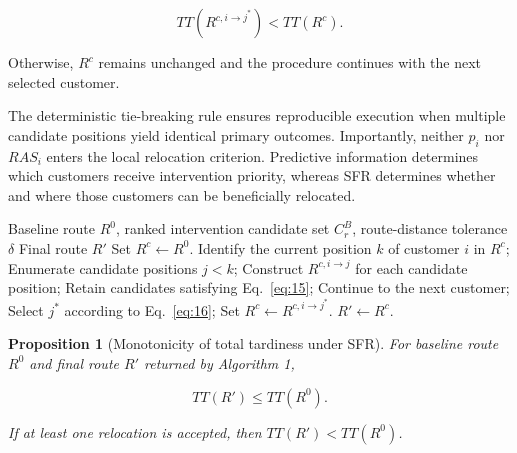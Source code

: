 \documentclass[11pt,a4paper]{article}
\newtheorem{proposition}{Proposition}
\begin{document}
\begin{equation}
TT\left( R^{c,i \rightarrow j^{*}} \right) < TT\left( R^{c} \right).
\label{eq:17}
\end{equation}

Otherwise, \(R^{c}\) remains unchanged and the procedure continues with
the next selected customer.

The deterministic tie-breaking rule ensures reproducible execution when
multiple candidate positions yield identical primary outcomes.
Importantly, neither \(p_{i}\) nor \(RAS_{i}\) enters the local
relocation criterion. Predictive information determines which customers
receive intervention priority, whereas SFR determines whether and where
those customers can be beneficially relocated.

\begin{algorithm}[htbp]
\caption{Selective Forward Relocation (SFR)}
\label{alg:sfr}
\begin{algorithmic}[1]
\Require Baseline route $R^{0}$, ranked intervention candidate set $C_{r}^{B}$, route-distance tolerance $\delta$
\Ensure Final route $R'$
\State Set $R^{c} \leftarrow R^{0}$.
    \State Identify the current position $k$ of customer $i$ in $R^{c}$;
    \State Enumerate candidate positions $j < k$;
    \State Construct $R^{c,i \rightarrow j}$ for each candidate position;
    \State Retain candidates satisfying Eq.~\eqref{eq:15};
        \State Continue to the next customer;
    \EndIf
    \State Select $j^{*}$ according to Eq.~\eqref{eq:16};
        \State Set $R^{c} \leftarrow R^{c,i \rightarrow j^{*}}$.
    \EndIf
\EndFor
\State \Return $R' \leftarrow R^{c}$.
\end{algorithmic}
\end{algorithm}

\begin{proposition}[Monotonicity of total tardiness under SFR]
For baseline route \(R^{0}\) \emph{and final route} \(R'\)
\emph{returned by Algorithm 1,}

\begin{equation}
TT\left( R' \right) \leq TT\left( R^{0} \right).
\label{eq:18}
\end{equation}

\emph{If at least one relocation is accepted, then}
\(TT\left( R' \right) < TT\left( R^{0} \right)\)\emph{.}

\end{proposition}
\end{document}
